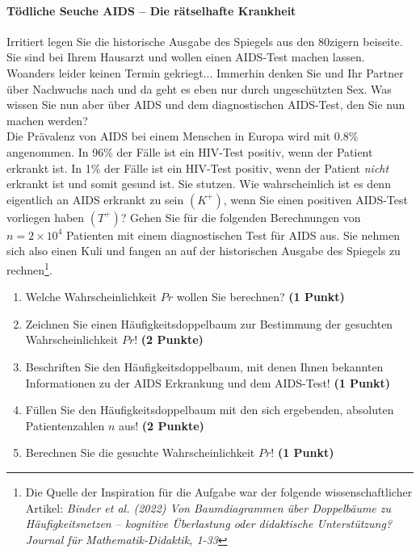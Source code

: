 \documentclass[a4paper, 9pt]{scrartcl}\usepackage[]{graphicx}\usepackage[]{xcolor}
\begin{document}
\paragraph{T{\"o}dliche Seuche AIDS -- Die r{\"a}tselhafte Krankheit}




Irritiert legen Sie die historische Ausgabe des Spiegels aus den 80zigern
beiseite. Sie sind bei Ihrem Hausarzt und wollen einen AIDS-Test machen
lassen. Woanders leider keinen Termin gekriegt... Immerhin denken Sie und
Ihr Partner {\"u}ber Nachwuchs nach und da geht es eben nur durch
ungesch{\"u}tzten Sex. Was wissen Sie nun aber {\"u}ber AIDS und dem diagnostischen
AIDS-Test, den Sie nun machen werden?\\

Die Pr{\"a}valenz von AIDS bei einem Menschen in Europa wird mit
0.8\% angenommen. In 96\% der F{\"a}lle ist ein
HIV-Test positiv, wenn der Patient erkrankt ist. In 1\%
der F{\"a}lle ist ein HIV-Test positiv, wenn der Patient \textit{nicht}
erkrankt ist und somit gesund ist. Sie stutzen. Wie wahrscheinlich ist es
denn eigentlich an AIDS erkrankt zu sein $(K^+)$, wenn Sie einen positiven
AIDS-Test vorliegen haben $(T^+)$? Gehen Sie f{\"u}r die folgenden Berechnungen
von $n = \ensuremath{2\times 10^{4}}$ Patienten mit einem diagnostischen Test f{\"u}r AIDS
aus. Sie nehmen sich also einen Kuli und fangen an auf der historischen
Ausgabe des Spiegels zu rechnen\footnote{Die Quelle der Inspiration f{\"u}r die
  Aufgabe war der folgende wissenschaftlicher Artikel: \textit{Binder et
    al. (2022) Von Baumdiagrammen {\"u}ber Doppelb{\"a}ume zu H{\"a}ufigkeitsnetzen --
    kognitive {\"U}berlastung oder didaktische Unterst{\"u}tzung? Journal f{\"u}r
    Mathematik-Didaktik, 1-33}}.

\begin{enumerate}
\item Welche Wahrscheinlichkeit $Pr$ wollen Sie berechnen? \textbf{(1 Punkt)}
\item Zeichnen Sie einen H{\"a}ufigkeitsdoppelbaum zur Bestimmung der gesuchten
  Wahrscheinlichkeit $Pr$! \textbf{(2 Punkte)} 
\item Beschriften Sie den H{\"a}ufigkeitsdoppelbaum, mit denen Ihnen bekannten
  Informationen zu der AIDS Erkrankung und dem AIDS-Test! \textbf{(1 Punkt)}
\item F{\"u}llen Sie den H{\"a}ufigkeitsdoppelbaum mit den sich ergebenden,
  absoluten Patientenzahlen $n$ aus! \textbf{(2 Punkte)}
\item Berechnen Sie die gesuchte Wahrscheinlichkeit $Pr$! \textbf{(1 Punkt)}
\end{enumerate}
\end{document}
